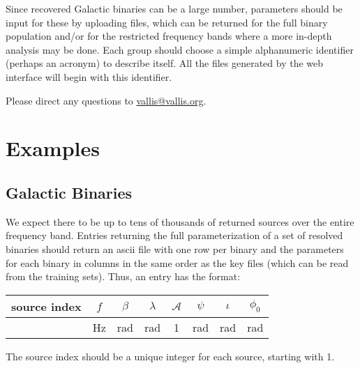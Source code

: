 \documentclass[11pt]{article}
\begin{document}
Since recovered Galactic binaries can be a large number, parameters should be
input for these by uploading files, which can be returned for the full binary population and/or for the restricted frequency bands where a more in-depth analysis may be done.
Each group should choose a simple alphanumeric identifier (perhaps an acronym) to describe itself. All the files generated by the web interface will begin with this identifier.

Please direct any questions to \url{vallis@vallis.org}.

\section{Examples}
\subsection{Galactic Binaries}
We expect there to be up to tens of thousands of returned sources over the entire frequency band. Entries returning the full parameterization of a set of resolved binaries should return an ascii file with one row per binary and the parameters for each binary in columns in the same order as the key files (which can be read from the training sets). Thus, an entry has the format:
\begin{center}
   \begin{tabular}{cccccccc}
      \hline
      source index & $f$ & $\beta$ & $\lambda$ & $\mathcal{A}$ & $\psi$ & $\iota$ & $\phi_0$ \\
      \hline
      & Hz & rad & rad & 1 & rad & rad & rad \\
      \hline
   \end{tabular}
   \label{galacticbinaries}
\end{center}
The source index should be a unique integer for each source, starting with 1.
\end{document}
